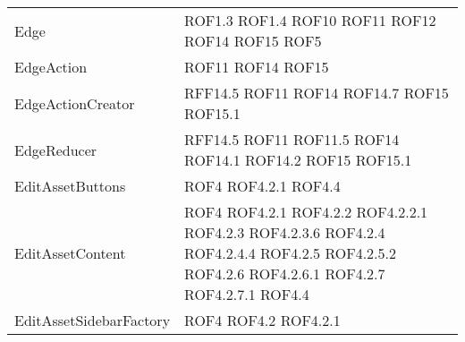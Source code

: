 \begin{longtable}{p{5cm}!{\VRule[1pt]}p{2.5cm}}
		Edge & ROF1.3 \newline ROF1.4 \newline ROF10 \newline ROF11 \newline ROF12 \newline ROF14 \newline ROF15 \newline ROF5\\
		EdgeAction & ROF11 \newline ROF14 \newline ROF15\\
		EdgeActionCreator & RFF14.5 \newline ROF11 \newline ROF14 \newline ROF14.7 \newline ROF15 \newline ROF15.1\\
		EdgeReducer & RFF14.5 \newline ROF11 \newline ROF11.5 \newline ROF14 \newline ROF14.1 \newline ROF14.2 \newline ROF15 \newline ROF15.1\\
		EditAssetButtons & ROF4 \newline ROF4.2.1 \newline ROF4.4\\
		EditAssetContent & ROF4 \newline ROF4.2.1 \newline ROF4.2.2 \newline ROF4.2.2.1 \newline ROF4.2.3 \newline ROF4.2.3.6 \newline ROF4.2.4 \newline ROF4.2.4.4 \newline ROF4.2.5 \newline ROF4.2.5.2 \newline ROF4.2.6 \newline ROF4.2.6.1 \newline ROF4.2.7 \newline ROF4.2.7.1 \newline ROF4.4\\
		EditAssetSidebarFactory & ROF4 \newline ROF4.2 \newline ROF4.2.1\\

\end{longtable}
